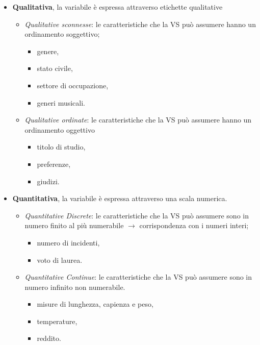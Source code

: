 \documentclass[
  11pt,
]{book}
\providecommand{\tightlist}{%
  \setlength{\itemsep}{0pt}\setlength{\parskip}{0pt}}
\theoremstyle{mytheoremstyle}
\theoremstyle{mydefstyle}
\begin{document}
\begin{info}

\begin{itemize}
\tightlist
\item
  \textbf{Qualitativa}, la variabile è espressa attraverso etichette qualitative

  \begin{itemize}
  \tightlist
  \item
    \emph{Qualitative sconnesse}: le caratteristiche che la VS può assumere hanno un ordinamento soggettivo;

    \begin{itemize}
    \tightlist
    \item
      genere,
    \item
      stato civile,
    \item
      settore di occupazione,
    \item
      generi musicali.
    \end{itemize}
  \item
    \emph{Qualitative ordinate}: le caratteristiche che la VS può assumere hanno un ordinamento oggettivo

    \begin{itemize}
    \tightlist
    \item
      titolo di studio,
    \item
      preferenze,
    \item
      giudizi.
    \end{itemize}
  \end{itemize}
\item
  \textbf{Quantitativa}, la variabile è espressa attraverso una scala numerica.

  \begin{itemize}
  \tightlist
  \item
    \emph{Quantitative Discrete}: le caratteristiche che la VS può assumere sono in numero finito al più numerabile \(\rightarrow\) corrispondenza con i numeri interi;

    \begin{itemize}
    \tightlist
    \item
      numero di incidenti,
    \item
      voto di laurea.
    \end{itemize}
  \item
    \emph{Quantitative Continue}: le caratteristiche che la VS può assumere sono in numero infinito non numerabile.

    \begin{itemize}
    \tightlist
    \item
      misure di lunghezza, capienza e peso,
    \item
      temperature,
    \item
      reddito.
    \end{itemize}
  \end{itemize}
\end{itemize}

\end{info}
\end{document}
